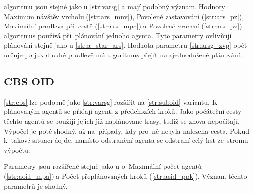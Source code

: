  algoritmu jsou stejné jako u \ref{str:varsg} a mají podobný význam.
Hodnoty Maximum návštěv vrcholu (\ref{str:ars_mnv}), Povolené zastavování (\ref{str:ars_pz}),
Maximální prodleva při~cestě (\ref{str:ars_mpc}) a Povolené vracení (\ref{str:ars_pv})
algoritmus používá při~plánování jednoho agenta.
Tyto \hyperref[subsubsec:ars_parametry]{parametry} ovlivňují plánování stejně jako u \ref{str:a_star_ars}.
Hodnota parametru \ref{str:arsg_zvp} opět určuje po jak dlouhé prodlevě má algoritmus přejít na zjednodušené plánování.

\subsection{CBS-OID}\label{subsec:cbsoid}

\ref{str:cbs} lze podobně jako \ref{str:varsg} rozšířit na \ref{str:suboid} variantu.
K plánovaným agentů se přidají agenti z předchozích kroků.
Jako počáteční cesty těchto agentů se použijí jejich již naplánované trasy, tudíž se znova nepočítají.
Výpočet je poté shodný, až na~případy, kdy pro~ně nebyla nalezena cesta.
Pokud k~takové situaci dojde, namísto odstranění agenta se odstraní celý list ze~stromu výpočtu.

Parametry jsou rozšířené stejně jako u  o~Maximální počet agentů (\ref{str:aoid_mpa})
a Počet přeplánovaných kroků (\ref{str:aoid_ppk}).
Význam těchto parametrů je shodný.

